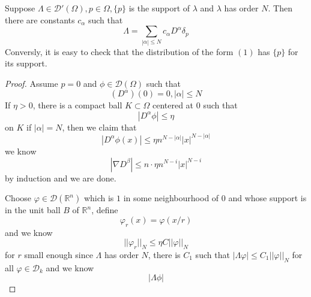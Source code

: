 \documentclass[lang=en, color=blue, ]{elegantbook}
\newcommand{\R}{\mathbb{R}}
\newcommand{\D}{\mathscr{D}}
\begin{document}
\begin{theorem}
    Suppose $\Lambda \in \D'(\Omega), p\in \Omega, \{p\}$ is the support of $\lambda$ and $\lambda$ has order $N$. Then there are constants $c_{\alpha}$ such that
    \[
    \Lambda = \sum\limits_{|\alpha| \leq N} c_{\alpha}D^{\alpha}\delta_p
    \]
    Conversly, it is easy to check that the distribution of the form $(1)$ has $\{p\}$ for its support.
\end{theorem}
\begin{proof}
    Assume $p = 0$ and $\phi \in \D(\Omega)$ such that
    \[
    (D^{\alpha})(0) = 0, |\alpha| \leq N
    \]
    If $\eta > 0$, there is a compact ball $K\subset \Omega$ centered at $0$ such that
    \[|D^{\alpha} \phi| \leq \eta\]
    on $K$ if $|\alpha| = N$, then we claim that
    \[
    |D^{\alpha} \phi(x)| \leq \eta n^{N-|\alpha|}|x|^{N-|\alpha|}
    \]
    we know 
    \[|\nabla D^{\beta}| \leq n\cdot \eta n^{N-i}|x|^{N-i}\]
    by induction and we are done.\par
    Choose $\varphi \in \D(\R^n)$ which is $1$ in some neighbourhood of $0$ and whose support is in the unit ball $B$ of $\R^n$, define
    \[
    \varphi_r(x) = \varphi(x/r)
    \]
    and we know
    \[
    ||\varphi_r||_N \leq \eta C||\varphi||_N
    \]
    for $r$ small enough since $\Lambda$ has order $N$, there is $C_1$ such that $|\Lambda \varphi| \leq C_1||\varphi||_N$ for all $\varphi \in \D_k$ and we know
    \[
    |\Lambda \phi| 
    \]
\end{proof}
\end{document}
